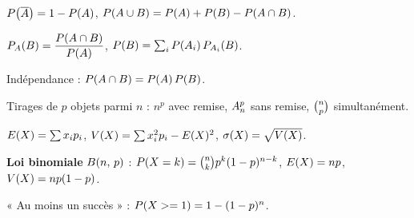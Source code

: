 \noindent
$\proba{\evtc{A}} = 1-\proba{A}$, \quad
$\proba{A \cup B} = \proba{A}+\proba{B}-\proba{A \cap B}$.

\smallskip
\noindent
$\probacond{B}{A} = \dfrac{\proba{A \cap B}}{\proba{A}}$, \quad
$\proba{B} = \sum_{i}\proba{A_{i}}\probacond{B}{A_{i}}$.

\smallskip
\noindent
Indépendance : $\proba{A \cap B} = \proba{A}\proba{B}$.

\smallskip
\noindent
Tirages de $p$ objets parmi $n$ : $n^{p}$ avec remise, $\arrang{p}{n}$ sans
remise, $\combi{p}{n}$ simultanément.

\smallskip
\noindent
$\Esp(X) = \sum x_{i}p_{i}$, \quad
$\Var(X) = \sum x_{i}^{2}p_{i}-\Esp(X)^{2}$, \quad
$\ecart(X) = \sqrt{\Var(X)}$.

\smallskip
\noindent
\textbf{Loi binomiale} $\loibin{n}{p}$ :
$\proba{X = k} = \combi{k}{n}p^{k}(1-p)^{n-k}$, \quad
$\Esp(X) = np$, \quad $\Var(X) = np(1-p)$.

\smallskip
\noindent
« Au moins un succès » : $\proba{X \geq 1} = 1-(1-p)^{n}$.
